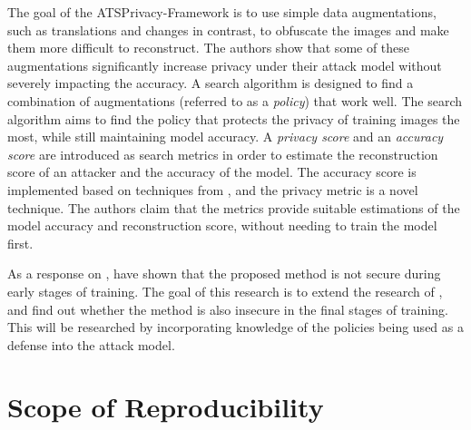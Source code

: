 The goal of the ATSPrivacy-Framework is to use simple data augmentations, such as translations and changes in contrast, to obfuscate the images and make them more difficult to reconstruct. The authors show that some of these augmentations significantly increase privacy under their attack model without severely impacting the accuracy. A search algorithm is designed to find a combination of augmentations (referred to as a \textit{policy}) that work well. The search algorithm aims to find the policy that protects the privacy of training images the most, while still maintaining model accuracy. A \textit{privacy score} and an \textit{accuracy score} are introduced as search metrics in order to estimate the reconstruction score of an attacker and the accuracy of the model. The accuracy score is implemented based on techniques from \citeauthor{mellor2021neural} \cite{mellor2021neural}, and the privacy metric is a novel technique. The authors claim that the metrics provide suitable estimations of the model accuracy and reconstruction score, without needing to train the model first.

As a response on \citeauthor{gao2021privacy}, \citeauthor{balunovic2021bayesian} \cite{balunovic2021bayesian} have shown that the proposed method is not secure during early stages of training. The goal of this research is to extend the research of \citeauthor{gao2021privacy}, and find out whether the method is also insecure in the final stages of training. This will be researched by incorporating knowledge of the policies being used as a defense into the attack model.


\section{Scope of Reproducibility}
\label{sec:claims}


